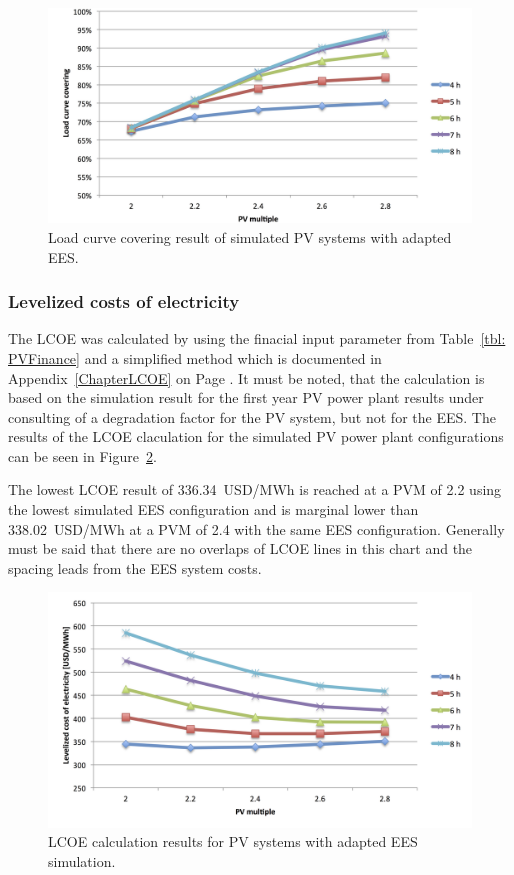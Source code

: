 \begin{figure}[htbp]  
\centering
\includegraphics[width=1\linewidth]{FIG/PV_LCCF}
\caption[Load curve covering result of simulated PV systems with adapted EES.]{Load curve covering result of simulated PV systems with adapted EES.}\label{PV_LCCF}
\end{figure}
\pagebreak
\subsubsection{Levelized costs of electricity}
The LCOE was calculated by using the finacial input parameter from Table~\ref{tbl: PVFinance} and a simplified method which is documented in Appendix~\ref{ChapterLCOE} on Page \pageref{ChapterLCOE}. It must be noted, that the calculation is based on the simulation result for the first year PV power plant results under consulting of a degradation factor for the PV system, but not for the EES. The results of the LCOE claculation for the simulated PV power plant configurations can be seen in Figure~\ref{PV_LCOE}. 

The lowest LCOE result of \SI{336.34}{USD/MWh} is reached at a PVM of 2.2 using the lowest simulated EES configuration and is marginal lower than  \SI{338.02}{USD/MWh} at a PVM of 2.4 with the same EES configuration. Generally must be said that there are no overlaps of LCOE lines in this chart and the spacing leads from the EES system costs.

\begin{figure}[htbp]  
\centering
\includegraphics[width=1\linewidth]{FIG/PV_LCOE}
\caption[LCOE calculation results for PV systems with adapted EES simulation.]{LCOE calculation results for PV systems with adapted EES simulation.}\label{PV_LCOE}
\end{figure}

